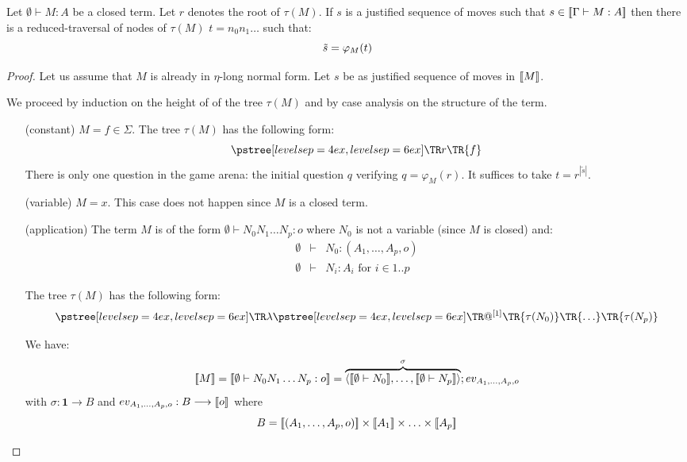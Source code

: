 \begin{prop}
\label{prop:rel_gamesem_redtrav_closed}
Let $\emptyset \vdash M : A$ be a closed term.
Let $r$ denotes the root of $\tau(M)$. If $s$ is a justified sequence of moves such
that $s \in {[\![\Gamma \vdash M:A ]\!]}$ then there is a reduced-traversal of nodes of $\tau(M)$
$t = n_0 n_1 \ldots$ such that:
 $$\tilde{s} =  \varphi_M(t)$$
\end{prop}
\begin{proof}
Let us assume that $M$ is already in $\eta$-long normal form.
Let $s$ be as justified sequence of moves in ${[\![ M ]\!]}$.

We proceed by induction on the height of of
the tree $\tau(M)$ and by case analysis on the structure of the term.

\begin{itemize}
  \item[(constant)] $M = f \in \Sigma$. The tree $\tau(M)$ has the following form:
  $$ \tree[levelsep=6ex]{r}{ \TR{f} }$$
  There is only one question in the game arena: the initial question $q$ verifying $ q = \varphi_M(r)$.
  It suffices to take $t = r^{|\tilde{s}|}$.

  \item[(variable)] $M = x$. This case does not happen since $M$ is a closed term.

  \item[(application)] The term $M$ is of the form $\emptyset \vdash N_0 N_1 \ldots N_p : o$ where $N_0$ is not
    a variable (since $M$ is closed) and:
    \begin{eqnarray*}
    \emptyset &\vdash& N_0 : (A_1,\ldots,A_p,o)\\
    \emptyset &\vdash& N_i : A_i \mbox{ for } i \in 1..p
    \end{eqnarray*}

    The tree $\tau(M)$ has the following form:
    $$ \tree[levelsep=6ex]{\lambda}
        { \tree[levelsep=6ex]{@^{[1]}}
            {   \TR{\tau(N_0)} \TR{\ldots} \TR{\tau(N_p)}}}
    $$

    We have:
    $$\sem{M} = \sem{\emptyset \vdash N_0 N_1 \ldots N_p : o} = \overbrace{\langle \sem{\emptyset \vdash N_0}, \ldots, \sem{\emptyset \vdash N_p} \rangle}^\sigma ; ev_{A_1,\ldots,A_p,o}$$
    with $\sigma : \textbf{1} \longrightarrow B$ and $ev_{A_1,\ldots,A_p,o} : B \longrightarrow {[\![o ]\!]}$ where
    $$ B = {[\![ (A_1,\ldots,A_p,o) ]\!]} \times {[\![A_1 ]\!]} \times \ldots \times {[\![A_p ]\!]} $$


\end{itemize}
\end{proof}
